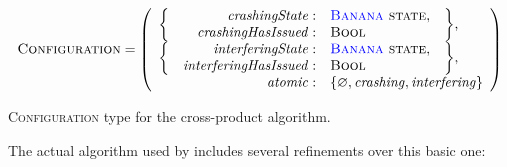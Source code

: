\begin{sanefig}
  \begin{displaymath}
    \textsc{Configuration} = \left(\begin{array}{rrll}
      \multirow{2}{*}{\bigg\{} & \mathit{crashingState}: & \textsc{{\STateMachine} state}, & \multirow{2}{*}{\bigg\},}\\
                               & \mathit{crashingHasIssued}: & \textsc{Bool}\\
      \multirow{2}{*}{\bigg\{} & \mathit{interferingState}: & \textsc{{\STateMachine} state}, & \multirow{2}{*}{\bigg\},} \\
                               & \mathit{interferingHasIssued}: & \textsc{Bool}\\
      \multicolumn{2}{r}{\mathit{atomic}:} & \multicolumn{2}{l}{\{ \varnothing, \mathit{crashing}, \mathit{interfering} \}}
    \end{array}\right)
  \end{displaymath}
  \caption{\textsc{Configuration} type for the cross-product algorithm.}
  \label{fig:cross_product:configuration}
\end{sanefig}
The actual algorithm used by {\technique} includes several refinements
over this basic one:
